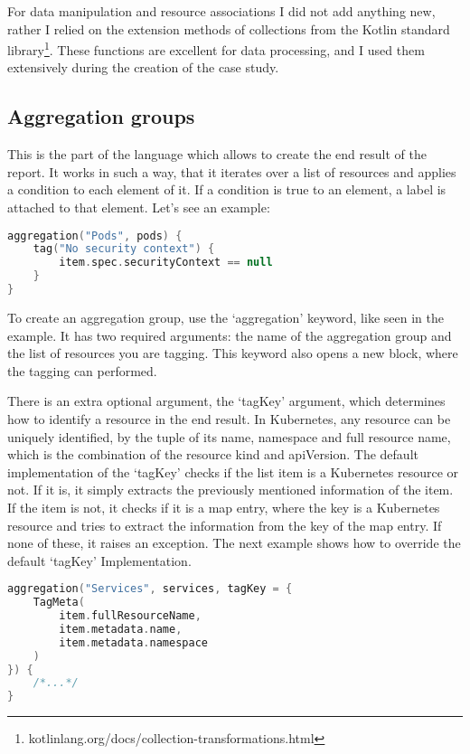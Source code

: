 For data manipulation and resource associations I did not add anything new, rather I relied on the extension methods of collections from the Kotlin standard library\footnote{kotlinlang.org/docs/collection-transformations.html}. These functions are excellent for data processing, and I used them extensively during the creation of the case study.

\subsection{Aggregation groups}

This is the part of the language which allows to create the end result of the report. It works in such a way, that it iterates over a list of resources and applies a condition to each element of it. If a condition is true to an element, a label is attached to that element. Let's see an example:

\begin{minipage}{\linewidth}
\begin{lstlisting}[caption={Aggregation group example},language=Kotlin,label=code:aggregation_group]
aggregation("Pods", pods) {
    tag("No security context") {
        item.spec.securityContext == null
    }
}
\end{lstlisting}
\end{minipage}

To create an aggregation group, use the `aggregation' keyword, like seen in the example. It has two required arguments: the name of the aggregation group and the list of resources you are tagging. This keyword also opens a new block, where the tagging can performed.

There is an extra optional argument, the `tagKey' argument, which determines how to identify a resource in the end result. In Kubernetes, any resource can be uniquely identified, by the tuple of its name, namespace and full resource name, which is the combination of the resource kind and apiVersion. The default implementation of the `tagKey' checks if the list item is a Kubernetes resource or not. If it is, it simply extracts the previously mentioned information of the item. If the item is not, it checks if it is a map entry, where the key is a Kubernetes resource and tries to extract the information from the key of the map entry. If none of these, it raises an exception. The next example shows how to override the default `tagKey' Implementation.

\begin{lstlisting}[caption={Override tagKey},language=Kotlin,label=code:tagkey]
aggregation("Services", services, tagKey = {
    TagMeta(
        item.fullResourceName,
        item.metadata.name,
        item.metadata.namespace
    )
}) {
    /*...*/
}
\end{lstlisting}

